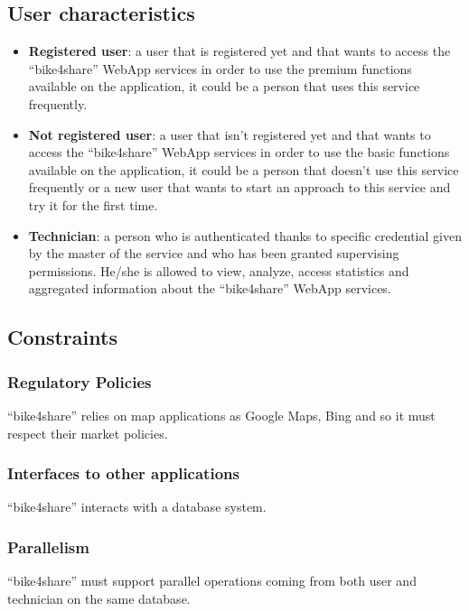 \documentclass{article}
\begin{document}
\subsection{User characteristics}
\begin{itemize}
    \item \textbf{Registered user}: a user that is registered yet and that wants to access the “bike4share” WebApp services in order to use the premium functions available on the application, it could be a person that uses this service frequently. 
    \item \textbf{Not registered user}: a user that isn’t registered yet and that wants to access the “bike4share” WebApp  services in order to use the basic functions available on the application, it could be a person that  doesn’t use this service frequently or a new user that wants to start an approach to this service and try it for the first time.
    \item \textbf{Technician}: a person who is authenticated thanks to specific credential given by the master of the service and  who has been granted supervising permissions. He/she is allowed to view, analyze, access statistics and aggregated information about the “bike4share” WebApp services.
\end{itemize}

\subsection{Constraints}
\subsubsection{Regulatory Policies}
“bike4share” relies on map applications as Google Maps, Bing  and so it must respect their market policies.

\subsubsection{Interfaces to other applications}
“bike4share” interacts with a database system.

\subsubsection{Parallelism}
“bike4share” must support parallel operations coming from both user and technician on the same database.
\end{document}
